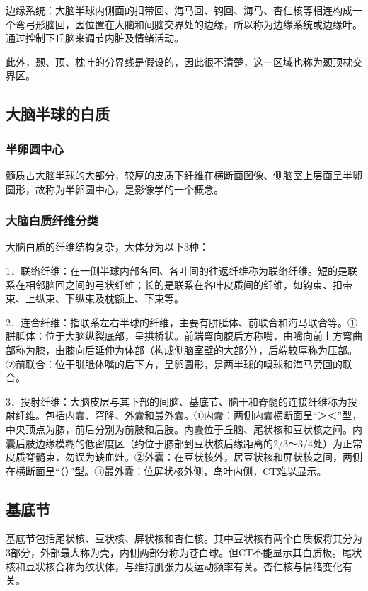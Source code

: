 边缘系统：大脑半球内侧面的扣带回、海马回、钩回、海马、杏仁核等相连构成一个弯弓形脑回，因位置在大脑和间脑交界处的边缘，所以称为边缘系统或边缘叶。通过控制下丘脑来调节内脏及情绪活动。

此外，颞、顶、枕叶的分界线是假设的，因此很不清楚，这一区域也称为颞顶枕交界区。

\subsection{大脑半球的白质}

\subsubsection{半卵圆中心}

髓质占大脑半球的大部分，较厚的皮质下纤维在横断面图像、侧脑室上层面呈半卵圆形，故称为半卵圆中心，是影像学的一个概念。

\subsubsection{大脑白质纤维分类}

大脑白质的纤维结构复杂，大体分为以下3种：

1．联络纤维：在一侧半球内部各回、各叶间的往返纤维称为联络纤维。短的是联系在相邻脑回之间的弓状纤维；长的是联系在各叶皮质间的纤维，如钩束、扣带束、上纵束、下纵束及枕额上、下束等。

2．连合纤维：指联系左右半球的纤维，主要有胼胝体、前联合和海马联合等。①胼胝体：位于大脑纵裂底部，呈拱桥状。前端弯向腹后方称嘴，由嘴向前上方弯曲部称为膝，由膝向后延伸为体部（构成侧脑室壁的大部分），后端较厚称为压部。②前联合：位于胼胝体嘴的后下方，呈卵圆形，是两半球的嗅球和海马旁回的联合。

3．投射纤维：大脑皮层与其下部的间脑、基底节、脑干和脊髓的连接纤维称为投射纤维。包括内囊、穹隆、外囊和最外囊。①内囊：两侧内囊横断面呈“＞＜”型，中央顶点为膝，前后分别为前肢和后肢。内囊位于丘脑、尾状核和豆状核之间。内囊后肢边缘模糊的低密度区（约位于膝部到豆状核后缘距离的2/3～3/4处）为正常皮质脊髓束，勿误为缺血灶。②外囊：在豆状核外，居豆状核和屏状核之间，两侧在横断面呈“（）”型。③最外囊：位屏状核外侧，岛叶内侧，CT难以显示。

\subsection{基底节}

基底节包括尾状核、豆状核、屏状核和杏仁核。其中豆状核有两个白质板将其分为3部分，外部最大称为壳，内侧两部分称为苍白球。但CT不能显示其白质板。尾状核和豆状核合称为纹状体，与维持肌张力及运动频率有关。杏仁核与情绪变化有关。

